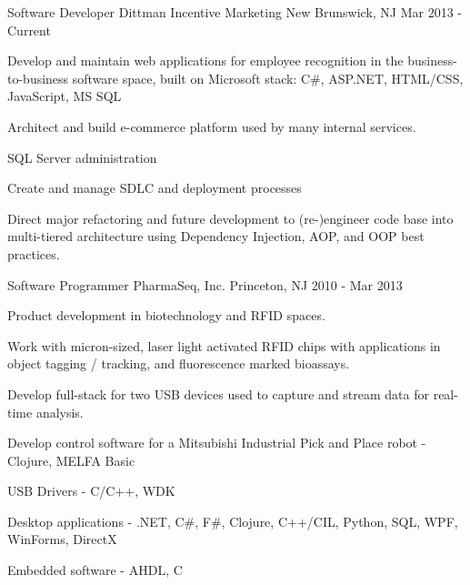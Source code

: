 \documentclass[11pt, letterpaper]{awesome-cv}
\begin{document}


\begin{cventries}
  \cventry
    {Software Developer} %
    {Dittman Incentive Marketing} %
    {New Brunswick, NJ} %
    {Mar 2013 - Current} 
    {
      \begin{cvitems} 
        \item {Develop and maintain web applications for employee recognition in the business-to-business software space, built on Microsoft stack: C\#, ASP.NET, HTML/CSS, JavaScript, MS SQL}
        \item {Architect and build e-commerce platform used by many internal services.}
        \item {SQL Server administration}
        \item {Create and manage SDLC and deployment processes}
        \item {Direct major refactoring and future development to (re-)engineer code base into multi-tiered architecture using Dependency Injection, AOP, and OOP best practices.}
      \end{cvitems}
    }

  \cventry
    {Software Programmer} %
    {PharmaSeq, Inc.} %
    {Princeton, NJ} %
    {2010 - Mar 2013} %
    {
      \begin{cvitems} 
        \item {Product development in biotechnology and RFID spaces.}
        \item {Work with micron-sized, laser light activated RFID chips with applications in object tagging / tracking, and fluorescence marked bioassays.}
        \item {Develop full-stack for two USB devices used to capture and stream data for real-time analysis.}
        \item {Develop control software for a Mitsubishi Industrial Pick and Place robot - Clojure, MELFA Basic}
        \item {USB Drivers - C/C++, WDK}
        \item {Desktop applications - .NET, C\#, F\#, Clojure, C++/CIL, Python, SQL, WPF, WinForms, DirectX}
        \item {Embedded software - AHDL, C}
      \end{cvitems}
    }


\end{cventries}
\end{document}
